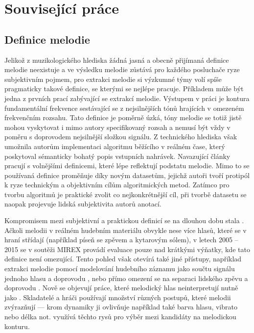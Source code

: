 \chapter{Související práce}

\section{Definice melodie}


Jelikož z muzikologického hlediska žádná jasná a obecně přijímaná definice melodie neexistuje a ve výsledku melodie zůstává pro každého posluchače ryze subjektivním pojmem, pro extrakci melodie si výzkumné týmy volí spíše pragmaticky takové definice, se kterými se nejlépe pracuje. Příkladem může být jedna z prvních prací zabývající se extrakcí melodie. Výstupem v práci \cite{Goto1999} je kontura fundamentální frekvence sestávající se z nejsilnějších tónů hrajících v omezeném frekvenčním rozsahu. Tato definice je poměrně úzká, tóny melodie se totiž jistě mohou vyskytovat i mimo autory specifikovaný rozsah a nemusí být vždy v poměru s doprovodem nejsilnější složkou signálu. Z technického hlediska však umožnila autorům implementaci algoritmu běžícího v reálném čase, který poskytoval sémanticky bohatý popis vstupních nahrávek. Navazující články pracují s volnějšími definicemi, které lépe reflektují podstatu melodie. Mimo to se používaná definice proměňuje díky novým datasetům, jejichž autoři tvoří protipól k ryze technickým a objektivním cílům algoritmických metod. Zatímco pro tvorbu algoritmů je praktické zvolit co nejkonkrétnější cíl, při tvorbě datasetu se naopak projevuje lidská subjektivita autorů anotací. 

Kompromisem mezi subjektivní a praktickou definicí se na dlouhou dobu stala . Ačkoli melodii v reálném hudebním materiálu obvykle nese více hlasů, které se v hraní střídají (například píseň se zpěvem a kytarovým sólem), v letech 2005 -- 2015 se v soutěži MIREX provádí evaluace pouze nad krátkými výňatky, kde tato definice není omezující. Tento pohled však otevírá také jiné přístupy, například extrakci melodie pomocí modelování hudebního záznamu jako součtu signálu jednoho hlasu a doprovodu \citep{Durrieu2010}, \citep{Bosch2016b} nebo přímo omezení se na separaci lidského zpěvu a doprovodu \citep{Ikemiya2016}. Nově se objevují práce, které  melodický hlas neinterpretují nutně jako . Skladatelé a hráči používají množství různých postupů, které melodii zvýrazňují --- krom dynamiky ji ovlivňuje například také barva hlasu, vibrato nebo délka not. \cite{Salamon2012a} využívá těchto rysů pro výběr mezi kandidáty na melodickou konturu.


